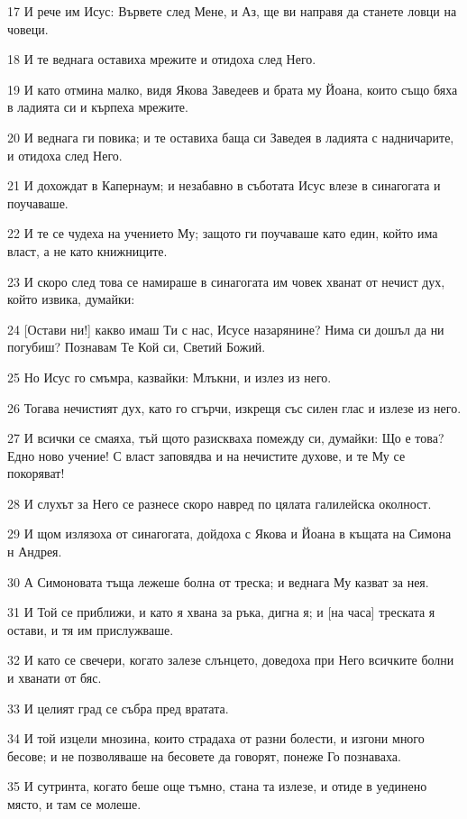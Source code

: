 \par 17 И рече им Исус: Вървете след Мене, и Аз, ще ви направя да станете ловци на човеци.
\par 18 И те веднага оставиха мрежите и отидоха след Него.
\par 19 И като отмина малко, видя Якова Заведеев и брата му Йоана, които също бяха в ладията си и кърпеха мрежите.
\par 20 И веднага ги повика; и те оставиха баща си Заведея в ладията с надничарите, и отидоха след Него.
\par 21 И дохождат в Капернаум; и незабавно в съботата Исус влезе в синагогата и поучаваше.
\par 22 И те се чудеха на учението Му; защото ги поучаваше като един, който има власт, а не като книжниците.
\par 23 И скоро след това се намираше в синагогата им човек хванат от нечист дух, който извика, думайки:
\par 24 [Остави ни!] какво имаш Ти с нас, Исусе назарянине? Нима си дошъл да ни погубиш? Познавам Те Кой си, Светий Божий.
\par 25 Но Исус го смъмра, казвайки: Млъкни, и излез из него.
\par 26 Тогава нечистият дух, като го сгърчи, изкрещя със силен глас и излезе из него.
\par 27 И всички се смаяха, тъй щото разискваха помежду си, думайки: Що е това? Едно ново учение! С власт заповядва и на нечистите духове, и те Му се покоряват!
\par 28 И слухът за Него се разнесе скоро навред по цялата галилейска околност.
\par 29 И щом излязоха от синагогата, дойдоха с Якова и Йоана в къщата на Симона н Андрея.
\par 30 А Симоновата тъща лежеше болна от треска; и веднага Му казват за нея.
\par 31 И Той се приближи, и като я хвана за ръка, дигна я; и [на часа] треската я остави, и тя им прислужваше.
\par 32 И като се свечери, когато залезе слънцето, доведоха при Него всичките болни и хванати от бяс.
\par 33 И целият град се събра пред вратата.
\par 34 И той изцели мнозина, които страдаха от разни болести, и изгони много бесове; и не позволяваше на бесовете да говорят, понеже Го познаваха.
\par 35 И сутринта, когато беше още тъмно, стана та излезе, и отиде в уединено място, и там се молеше.
